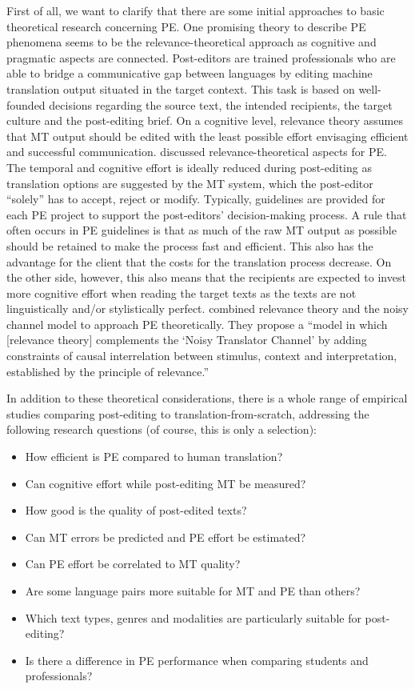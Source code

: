 First of all, we want to clarify that there are some initial approaches to basic theoretical research concerning PE. One promising theory to describe PE phenomena seems to be the relevance-theoretical approach as cognitive and pragmatic aspects are connected. Post-editors are trained professionals who are able to bridge a communicative gap between languages by editing machine translation output situated in the target context. This task is based on well-founded decisions regarding the source text, the intended recipients, the target culture and the post-editing brief. On a cognitive level, relevance theory assumes that MT output should be edited with the least possible effort envisaging efficient and successful communication. \citet{alves2016investigating} discussed relevance-theoretical aspects for PE. The temporal and cognitive effort is ideally reduced during post-editing as translation options are suggested by the MT system, which the post-editor “solely” has to accept, reject or modify. Typically, guidelines are provided for each PE project to support the post-editors’ decision-making process. A rule that often occurs in PE guidelines is that as much of the raw MT output as possible should be retained to make the process fast and efficient. This also has the advantage for the client that the costs for the translation process decrease. On the other side, however, this also means that the recipients are expected to invest more cognitive effort when reading the target texts as the texts are not linguistically and/or stylistically perfect. \citet{carl2019outline} combined relevance theory and the noisy channel model to approach PE theoretically. They propose a “model in which [relevance theory] complements the ‘Noisy Translator Channel’ by adding constraints of causal interrelation between stimulus, context and interpretation, established by the principle of relevance.” \citep[60]{carl2019outline}


In addition to these theoretical considerations, there is a whole range of empirical studies comparing post-editing to translation-from-scratch, addressing the following research questions (of course, this is only a selection): 
\begin{itemize}
    \item How efficient is PE compared to human translation?
    \item Can cognitive effort while post-editing MT be measured?
    \item How good is the quality of post-edited texts? 
    \item Can MT errors be predicted and PE effort be estimated?
    \item Can PE effort be correlated to MT quality?
    \item Are some language pairs more suitable for MT and PE than others?
    \item Which text types, genres and modalities are particularly suitable for post-editing?
    \item Is there a difference in PE performance when comparing students and professionals?
\end{itemize}

